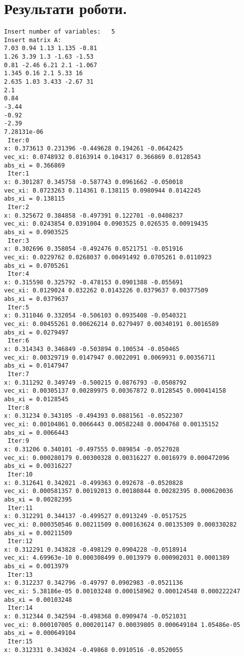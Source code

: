 \documentclass[14pt,a4paper]{scrartcl}
\theoremstyle{definition}
\theoremstyle{remark}
\theoremstyle{definition}
\theoremstyle{definition}
\begin{document}
\section{Результати роботи.}
\begin{verbatim}
Insert number of variables:   5
Insert matrix A:
7.03 0.94 1.13 1.135 -0.81
1.26 3.39 1.3 -1.63 -1.53
0.81 -2.46 6.21 2.1 -1.067
1.345 0.16 2.1 5.33 16
2.635 1.03 3.433 -2.67 31
2.1
0.84
-3.44
-0.92
-2.39
7.28131e-06
 Iter:0
x: 0.373613 0.231396 -0.449628 0.194261 -0.0642425
vec_xi: 0.0748932 0.0163914 0.104317 0.366869 0.0128543
abs_xi = 0.366869
 Iter:1
x: 0.301287 0.345758 -0.587743 0.0961662 -0.050018
vec_xi: 0.0723263 0.114361 0.138115 0.0980944 0.0142245
abs_xi = 0.138115
 Iter:2
x: 0.325672 0.384858 -0.497391 0.122701 -0.0408237
vec_xi: 0.0243854 0.0391004 0.0903525 0.026535 0.00919435
abs_xi = 0.0903525
 Iter:3
x: 0.302696 0.358054 -0.492476 0.0521751 -0.051916
vec_xi: 0.0229762 0.0268037 0.00491492 0.0705261 0.0110923
abs_xi = 0.0705261
 Iter:4
x: 0.315598 0.325792 -0.478153 0.0901388 -0.055691
vec_xi: 0.0129024 0.032262 0.0143226 0.0379637 0.00377509
abs_xi = 0.0379637
 Iter:5
x: 0.311046 0.332054 -0.506103 0.0935408 -0.0540321
vec_xi: 0.00455261 0.00626214 0.0279497 0.00340191 0.0016589
abs_xi = 0.0279497
 Iter:6
x: 0.314343 0.346849 -0.503894 0.100534 -0.050465
vec_xi: 0.00329719 0.0147947 0.0022091 0.0069931 0.00356711
abs_xi = 0.0147947
 Iter:7
x: 0.311292 0.349749 -0.500215 0.0876793 -0.0508792
vec_xi: 0.00305137 0.00289975 0.00367872 0.0128545 0.000414158
abs_xi = 0.0128545
 Iter:8
x: 0.31234 0.343105 -0.494393 0.0881561 -0.0522307
vec_xi: 0.00104861 0.0066443 0.00582248 0.0004768 0.00135152
abs_xi = 0.0066443
 Iter:9
x: 0.31206 0.340101 -0.497555 0.089854 -0.0527028
vec_xi: 0.000280179 0.00300328 0.00316227 0.0016979 0.000472096
abs_xi = 0.00316227
 Iter:10
x: 0.312641 0.342021 -0.499363 0.092678 -0.0520828
vec_xi: 0.000581357 0.00192013 0.00180844 0.00282395 0.000620036
abs_xi = 0.00282395
 Iter:11
x: 0.312291 0.344137 -0.499527 0.0913249 -0.0517525
vec_xi: 0.000350546 0.00211509 0.000163624 0.00135309 0.000330282
abs_xi = 0.00211509
 Iter:12
x: 0.312291 0.343828 -0.498129 0.0904228 -0.0518914
vec_xi: 4.69963e-10 0.000308499 0.0013979 0.000902031 0.0001389
abs_xi = 0.0013979
 Iter:13
x: 0.312237 0.342796 -0.49797 0.0902983 -0.0521136
vec_xi: 5.38186e-05 0.00103248 0.000158962 0.000124548 0.000222247
abs_xi = 0.00103248
 Iter:14
x: 0.312344 0.342594 -0.498368 0.0909474 -0.0521031
vec_xi: 0.000107005 0.000201147 0.00039805 0.000649104 1.05486e-05
abs_xi = 0.000649104
 Iter:15
x: 0.312331 0.343024 -0.49868 0.0910516 -0.0520055

\end{verbatim}
\end{document}
